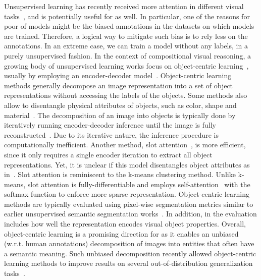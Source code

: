 Unsupervised learning has recently received more attention in different visual tasks~\citep{radford2015unsupervised,hjelm2018learning,chen2020simple,verma2021towards}, and is potentially useful for \cgshort as well.
In particular, one of the reasons for poor \cgshort of models might be the biased annotations in the datasets on which models are trained. Therefore, a logical way to mitigate such bias is to rely less on the annotations. In an extreme case, we can train a model without any labels, in a purely unsupervised fashion.
In the context of compositional visual reasoning, a growing body of unsupervised learning works focus on object-centric learning~\citep{greff2020binding}, usually by employing an encoder-decoder model~\citep{engelcke2019genesis,burgess2019monet,greff2019multi,locatello2020object}.
Object-centric learning methods generally decompose an image representation into a set of object representations without accessing the labels of the objects. Some methods also allow to disentangle physical attributes of objects, such as color, shape and material~\citep{greff2019multi}. The decomposition of an image into objects is typically done by iteratively running encoder-decoder inference until the image is fully reconstructed~\citep{greff2019multi}. 
Due to its iterative nature, the inference procedure is computationally inefficient.
Another method, slot attention~\citep{locatello2020object}, is more efficient, since it only requires a single encoder iteration to extract all object representations. Yet, it is unclear if this model disentangles object attributes as in~\citep{greff2019multi}. Slot attention is reminiscent to the k-means clustering method. Unlike k-means, slot attention is fully-differentiable and employs self-attention~\citep{vaswani2017attention} with the softmax function to enforce more sparse representation. Object-centric learning methods are typically evaluated using pixel-wise segmentation metrics similar to earlier unsupervised semantic segmentation works~\citep{arbelaez2010contour}.
In addition, in \citep{locatello2020object,greff2019multi} the evaluation includes how well the representation encodes visual object properties.
Overall, object-centric learning is a promising direction for \cgshort as it enables an unbiased (w.r.t. human annotations) decomposition of images into entities that often have a semantic meaning. Such unbiased decomposition recently allowed object-centric learning methods to improve results on several out-of-distribution generalization tasks~\citep{dittadi2021generalization}.

